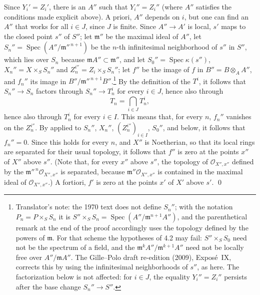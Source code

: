 Since \(Y_i'=Z_i'\), there is an \(A''\) such that \(Y_i''=Z_i''\)
(where \(A''\) satisfies the conditions made explicit above). A priori,
\(A''\) depends on \(i\), but one can find an \(A''\) that works for all
\(i\in J\), since \(J\) is finite. Since \(A''\to A'\) is local, \(s'\)
maps to the closed point \(s''\) of \(S''\); let \(\mathfrak m''\) be the
maximal ideal of \(A''\), let
\(S_n''=\operatorname{Spec}(A''/\mathfrak m''^{\,n+1})\) be the \(n\)-th
infinitesimal neighborhood of \(s''\) in \(S''\), which lies over \(S_n\)
because \(\mathfrak mA''\subset\mathfrak m''\), and let
\(S_0''=\operatorname{Spec}\kappa(s'')\), \(X_n''=X\times_SS_n''\) and
\(Z_n^{i''}=Z_i\times_SS_n''\); let \(f''\) be the image of \(f\) in
\(B''=B\otimes_AA''\), and \(f_n''\) its image in
\(B''/\mathfrak m''^{\,n+1}B''\).\footnote{Translator's note: the 1970 text
does not define \(S_n''\); with the notation \(P_n=P\times_SS_n\) it is
\(S''\times_SS_n=\operatorname{Spec}(A''/\mathfrak m^{n+1}A'')\), and the
parenthetical remark at the end of the proof accordingly uses the
topology defined by the powers of \(\mathfrak m\). For that scheme the
hypotheses of 4.2 may fail: \(S''\times_SS_0\) need not be the spectrum
of a field, and the \(\mathfrak m^kA''/\mathfrak m^{k+1}A''\) need not be
locally free over \(A''/\mathfrak mA''\). The Gille--Polo draft
re-edition (2009), Expos\'e~IX, corrects this by using the infinitesimal
neighborhoods of \(s''\), as here. The factorization below is not
affected: for \(i\in J\), the equality \(Y_i''=Z_i''\) persists after the
base change \(S_n''\to S''\).} By the definition of the \(T^i\), it
follows that \(S_n''\to S_n\) factors through \(S_n''\to T_n^i\) for every
\(i\in J\), hence also through
\[
  T_n=\bigcap_{i\in J}T_n^i,
\]
hence also through \(T_n^i\) for every \(i\in I\). This means that, for
every \(n\), \(f_n''\) vanishes on the \(Z_n^{i''}\). By
 applied to \(S_n''\), \(X_n''\),
\((Z_n^{i''})_{i\in I}\), \(S_0''\), and 
below, it follows that \(f_n''=0\). Since this holds for every \(n\), and
\(X''\) is Noetherian, so that its local rings are separated for their
usual topology, it follows that \(f''\) is zero at the points \(x''\) of
\(X''\) above \(s''\). (Note that, for every \(x''\) above \(s''\), the
topology of \(\mathscr O_{X'',x''}\) defined by the
\(\mathfrak m''^{\,n}\mathscr O_{X'',x''}\) is separated, because
\(\mathfrak m''\mathscr O_{X'',x''}\) is contained in the maximal ideal of
\(\mathscr O_{X'',x''}\).) A fortiori, \(f'\) is zero at the points
\(x'\) of \(X'\) above \(s'\). \qed


